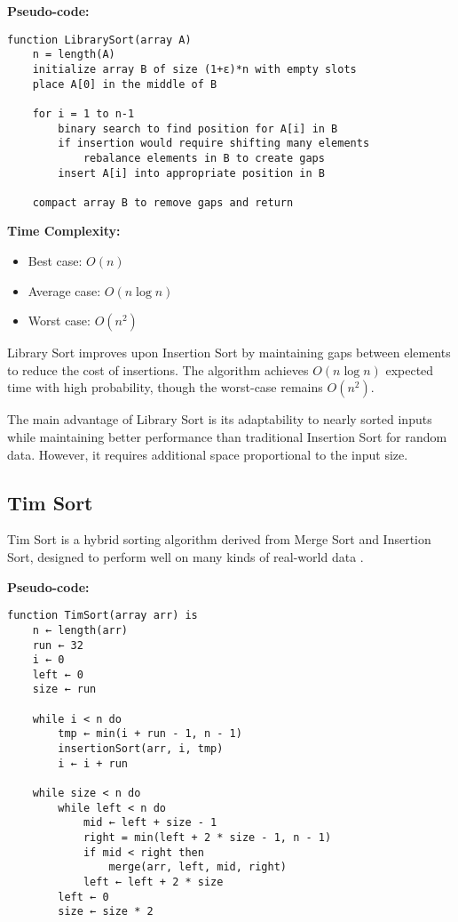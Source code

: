 \documentclass[sigconf]{acmart}
\begin{document}
\textbf{Pseudo-code:}
\begin{verbatim}
function LibrarySort(array A)
    n = length(A)
    initialize array B of size (1+ε)*n with empty slots
    place A[0] in the middle of B
    
    for i = 1 to n-1
        binary search to find position for A[i] in B
        if insertion would require shifting many elements
            rebalance elements in B to create gaps
        insert A[i] into appropriate position in B
    
    compact array B to remove gaps and return
\end{verbatim}

\textbf{Time Complexity:}
\begin{itemize}
    \item Best case: $O(n)$
    \item Average case: $O(n \log n)$
    \item Worst case: $O(n^2)$
\end{itemize}

Library Sort improves upon Insertion Sort by maintaining gaps between elements to reduce the cost of insertions. The algorithm achieves $O(n \log n)$ expected time with high probability, though the worst-case remains $O(n^2)$.

The main advantage of Library Sort is its adaptability to nearly sorted inputs while maintaining better performance than traditional Insertion Sort for random data. However, it requires additional space proportional to the input size.

\subsection{Tim Sort}
Tim Sort is a hybrid sorting algorithm derived from Merge Sort and Insertion Sort, designed to perform well on many kinds of real-world data \cite{timsort}.

\textbf{Pseudo-code:}
\begin{verbatim}
function TimSort(array arr) is
    n ← length(arr) 
    run ← 32
    i ← 0 
    left ← 0
    size ← run

    while i < n do
        tmp ← min(i + run - 1, n - 1)
        insertionSort(arr, i, tmp) 
        i ← i + run

    while size < n do 
        while left < n do
            mid ← left + size - 1 
            right = min(left + 2 * size - 1, n - 1) 
            if mid < right then
                merge(arr, left, mid, right) 
            left ← left + 2 * size
        left ← 0
        size ← size * 2
\end{verbatim}
\end{document}
